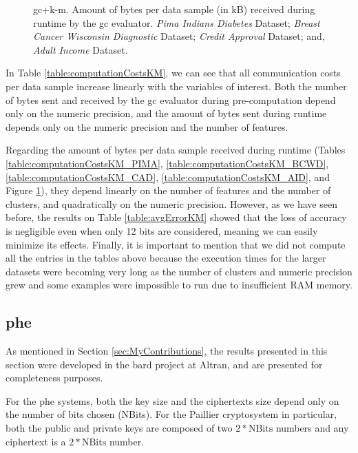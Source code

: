 \begin{figure}[hpt]
\caption[\acs{gc}+\acs{k-m}. Amount of bytes per data sample (in kB) received during runtime by the \ac{gc} evaluator. All datasets.]{\acs{gc}+\acs{k-m}. Amount of bytes per data sample (in kB) received during runtime by the \ac{gc} evaluator.
 \emph{Pima Indians Diabetes} Dataset;
 \emph{Breast Cancer Wisconsin Diagnostic} Dataset;
 \emph{Credit Approval} Dataset; and,
 \emph{Adult Income} Dataset.}%
\label{fig:km-gc-comm}%
\end{figure}


In Table \ref{table:computationCostsKM}, we can see that all communication costs per data sample increase linearly with the variables of interest. Both the number of bytes sent and received by the \ac{gc} evaluator during pre-computation depend only on the numeric precision, and the amount of bytes sent during runtime depends only on the numeric precision and the number of features.

Regarding the amount of bytes per data sample received during runtime (Tables \ref{table:computationCostsKM_PIMA}, \ref{table:computationCostsKM_BCWD}, \ref{table:computationCostsKM_CAD}, \ref{table:computationCostsKM_AID}, and Figure \ref{fig:km-gc-comm}), they depend linearly on the number of features and the number of clusters, and quadratically on the numeric precision. However, as we have seen before, the results on Table \ref{table:avgErrorKM} showed that the loss of accuracy is negligible even when only 12 bits are considered, meaning we can easily minimize its effects. Finally, it is important to mention that we did not compute all the entries in the tables above because the execution times for the larger datasets were becoming very long as the number of clusters and numeric precision grew and some examples were impossible to run due to insufficient RAM memory.


\subsection{\acl{phe}}
\label{ssec:comm_phe}

As mentioned in Section \ref{sec:MyContributions}, the results presented in this section were developed in the \ac{bard} project at Altran, and are presented for completeness purposes.

For the \ac{phe} systems, both the key size and the ciphertexts size depend only on the number of bits chosen (NBits). For the Paillier cryptosystem in particular, both the public and private keys are composed of two $2*\text{NBits}$ numbers and any ciphertext is a $2*\text{NBits}$ number.

